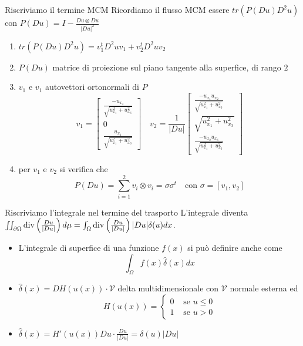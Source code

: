 \begin{frame}{Riscriviamo il termine MCM}
  Ricordiamo il flusso MCM essere $tr(P(Du)D^2u)$ con
  $P(Du)=I-\frac{Du\otimes Du}{|Du|^2}$
  \begin{enumerate}
    \item $tr(P(Du)D^2u)=v_1^tD^2uv_1+v_2^tD^2uv_2$
    \item $P(Du)$ matrice di proiezione sul piano tangente alla
      superfice, di rango $2$
    \item  $v_1$ e $v_1$ autovettori ortonormali di $P$ 
      \[
      v_1=
      \begin{bmatrix}
        \frac{-u_{x_3}}{\sqrt{u_{x_1}^2+u_{x_3}^2}} \\
        0 \\
        \frac{u_{x_1}}{\sqrt{u_{x_1}^2+u_{x_3}^2}}
      \end{bmatrix}
      \quad
      v_2=\frac{1}{|Du|}
      \begin{bmatrix}
        \frac{-u_{x_1}u_{x_2}}{\sqrt{u_{x_1}^2+u_{x_3}^2}} \\
        \sqrt{u_{x_1}^2+u_{x_3}^2} \\
        \frac{-u_{x_2}u_{x_3}}{\sqrt{u_{x_1}^2+u_{x_3}^2}}
      \end{bmatrix}
      \]
    \item per $v_1$ e $v_2$ si verifica che 
    \[
    P(Du)=\sum_{i=1}^2v_i\otimes v_i=\sigma\sigma^t\quad\text{con }
    \sigma=[v_1,v_2] 
    \]
  \end{enumerate}
\end{frame}

\begin{frame}{Riscriviamo l'integrale nel termine del trasporto}
 L'integrale diventa
 $\iint_{\partial\Omega}\operatorname{div}\left(\frac{Du}{|Du|}\right)d\mu=\int_{\Omega}\operatorname{div}\left(\frac{Du}{|Du|}\right)|Du|\delta(u)dx$.
 \begin{itemize}
   \item L'integrale di superfice di una funzione $f(x)$ si può
     definire anche come 
     \[
     \int_{\Omega}f(x)\hat{\delta}(x)dx
     \]   
   \item $\hat{\delta}(x)=DH(u(x))\cdot\mathcal{V}$ delta
     multidimensionale con $\mathcal{V}$ normale esterna ed 
     \[
     H(u(x))=
     \begin{cases}
       0 &\text{ se }u\leq 0 \\
       1 &\text{ se }u > 0
     \end{cases}
     \]
     \item $\hat{\delta}(x)=H'(u(x))Du\cdot\frac{Du}{|Du|}=\delta(u)|Du|$
 \end{itemize}
 \end{frame}
